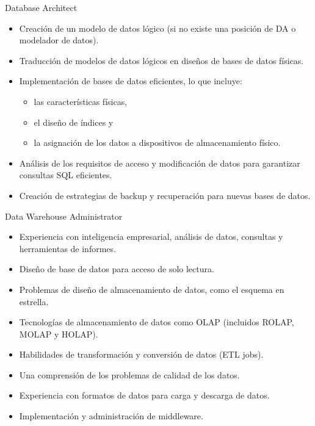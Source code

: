 \documentclass{beamer}
\begin{document}
\begin{frame}{Database Architect}
    \begin{itemize}
        \item Creación de un modelo de datos lógico (si no existe una posición de DA o modelador de datos).
        \item Traducción de modelos de datos lógicos en diseños de bases de datos físicas.
        \item Implementación de bases de datos eficientes, lo que incluye:
        \begin{itemize}
            \item las características físicas, 
            \item el diseño de índices y 
            \item la asignación de los datos a dispositivos de almacenamiento físico.
        \end{itemize}
        \item Análisis de los requisitos de acceso y modificación de datos para garantizar consultas SQL eficientes.
        \item Creación de estrategias de backup y recuperación para nuevas bases de datos.
    \end{itemize}
\end{frame}

\begin{frame}{Data Warehouse Administrator}
    \begin{itemize}
        \item Experiencia con inteligencia empresarial, análisis de datos, consultas y herramientas de informes.
        \item Diseño de base de datos para acceso de solo lectura.
        \item Problemas de diseño de almacenamiento de datos, como el esquema en estrella.
        \item Tecnologías de almacenamiento de datos como OLAP (incluidos ROLAP, MOLAP y HOLAP).
        \item Habilidades de transformación y conversión de datos (ETL jobs).
        \item Una comprensión de los problemas de calidad de los datos.
        \item Experiencia con formatos de datos para carga y descarga de datos.
        \item Implementación y administración de middleware.
    \end{itemize}
\end{frame}
\end{document}
